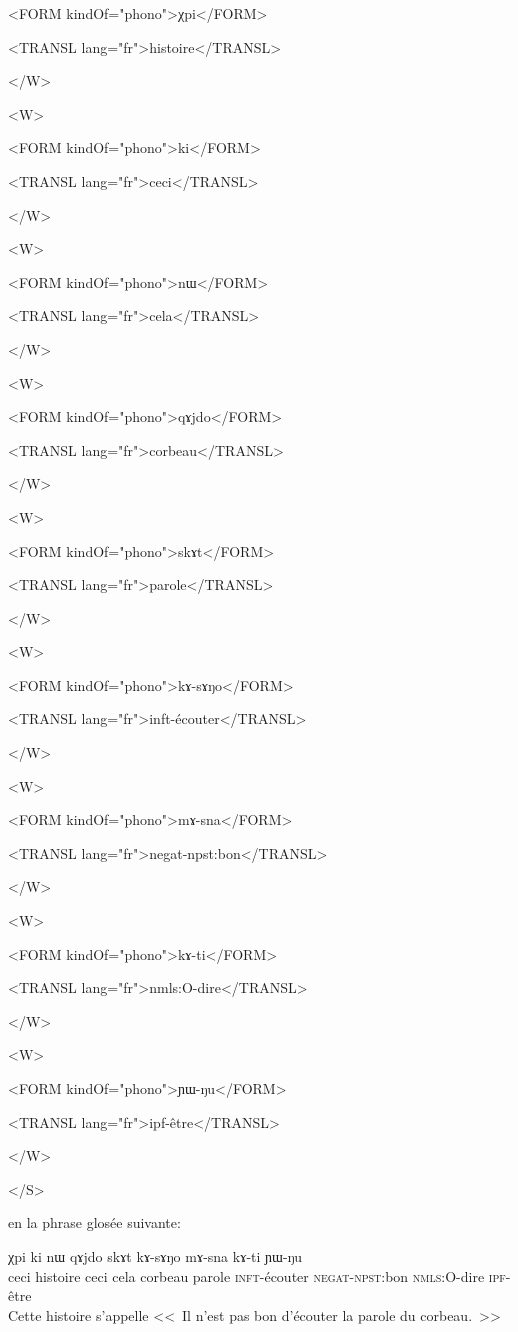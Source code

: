 \documentclass[oldfontcommands,oneside,a4paper,11pt]{memoir}
\newcommand{\ipa}[1]{{\phon #1}} %
\begin{document}
    
      <FORM kindOf="phono">χpi</FORM>
      
      
      <TRANSL lang="fr">histoire</TRANSL>
      
      
    </W>
    
    
    <W>


      <FORM kindOf="phono">ki</FORM>


      <TRANSL lang="fr">ceci</TRANSL>


    </W>


    <W>


      <FORM kindOf="phono">nɯ</FORM>


      <TRANSL lang="fr">cela</TRANSL>


    </W>


    <W>


      <FORM kindOf="phono">qɤjdo</FORM>


      <TRANSL lang="fr">corbeau</TRANSL>


    </W>


    <W>


      <FORM kindOf="phono">skɤt</FORM>


      <TRANSL lang="fr">parole</TRANSL>


    </W>


    <W>


      <FORM kindOf="phono">kɤ-sɤŋo</FORM>


      <TRANSL lang="fr">inft-écouter</TRANSL>


    </W>


    <W>


      <FORM kindOf="phono">mɤ-sna</FORM>


      <TRANSL lang="fr">negat-npst:bon</TRANSL>


    </W>


    <W>


      <FORM kindOf="phono">kɤ-ti</FORM>


      <TRANSL lang="fr">nmls:O-dire</TRANSL>


    </W>


    <W>


      <FORM kindOf="phono">ɲɯ-ŋu</FORM>


      <TRANSL lang="fr">ipf-être</TRANSL>


    </W>


  </S>
 
 
 
en  la phrase glosée suivante:

\begin{exe} 
 \ex 
\gll \ipa{kɯki} \ipa{χpi} \ipa{ki} \ipa{nɯ} \ipa{qɤjdo} \ipa{skɤt} \ipa{kɤ-sɤŋo} \ipa{mɤ-sna} \ipa{kɤ-ti} \ipa{ɲɯ-ŋu}\\ 
ceci histoire ceci cela corbeau parole \textsc{inft}-écouter \textsc{negat}-\textsc{npst}:bon \textsc{nmls}:O-dire \textsc{ipf}-être\\ 
 \glt Cette histoire s'appelle <<~Il n'est pas bon d'écouter la parole du corbeau.~>>
\end{exe} 
 
\end{document}
